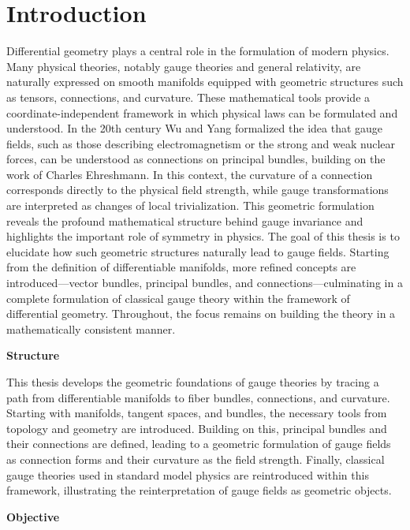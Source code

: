 \chapter{Introduction}

Differential geometry plays a central role in the formulation of modern physics. Many physical theories, notably gauge theories and general relativity, are naturally expressed on smooth manifolds equipped with geometric structures such as tensors, connections, and curvature. These mathematical tools provide a coordinate-independent framework in which physical laws can be formulated and understood. In the 20th century Wu and Yang formalized the idea that gauge fields, such as those describing electromagnetism or the strong and weak nuclear forces, can be understood as connections on principal bundles\cite{WuConceptnonintegrablephasefactorsglobalformulationgaugefields1975}, building on the work of Charles Ehreshmann. In this context, the curvature of a connection corresponds directly to the physical field strength, while gauge transformations are interpreted as changes of local trivialization. This geometric formulation reveals the profound mathematical structure behind gauge invariance and highlights the important role of symmetry in physics. The goal of this thesis is to elucidate how such geometric structures naturally lead to gauge fields. Starting from the definition of differentiable manifolds, more refined concepts are introduced—vector bundles, principal bundles, and connections—culminating in a complete formulation of classical gauge theory within the framework of differential geometry. Throughout, the focus remains on building the theory in a mathematically consistent manner. 

\textbf{Structure}

This thesis develops the geometric foundations of gauge theories by tracing a path from differentiable manifolds to fiber bundles, connections, and curvature. Starting with manifolds, tangent spaces, and bundles, the necessary tools from topology and geometry are introduced. Building on this, principal bundles and their connections are defined, leading to a geometric formulation of gauge fields as connection forms and their curvature as the field strength. Finally, classical gauge theories used in standard model physics are reintroduced within this framework, illustrating the reinterpretation of gauge fields as geometric objects.

\textbf{Objective}

